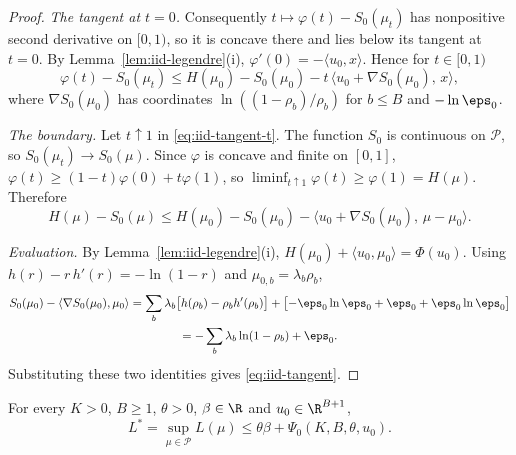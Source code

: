\begin{proof}
\emph{The tangent at $t=0$.} Consequently
$t\mapsto\varphi(t)-S_0(\mu_t)$ has nonpositive second derivative on $[0,1)$, so it is
concave there and lies below its tangent at $t=0$. By Lemma~\ref{lem:iid-legendre}(i),
$\varphi'(0)=-\langle u_0,x\rangle$. Hence for $t\in[0,1)$
\begin{equation}\label{eq:iid-tangent-t}
\varphi(t)-S_0(\mu_t)\le H(\mu_0)-S_0(\mu_0)-t\,\bigl\langle u_0+\nabla S_0(\mu_0),\,x\bigr\rangle,
\end{equation}
where $\nabla S_0(\mu_0)$ has coordinates $\ln((1-\rho_b)/\rho_b)$ for $b\le B$ and
$-\ln\eps_0$.

\emph{The boundary.} Let $t\uparrow1$ in \eqref{eq:iid-tangent-t}. The function $S_0$ is
continuous on $\mathcal{P}$, so $S_0(\mu_t)\to S_0(\mu)$. Since $\varphi$ is concave and
finite on $[0,1]$, $\varphi(t)\ge(1-t)\varphi(0)+t\varphi(1)$, so
$\liminf_{t\uparrow1}\varphi(t)\ge\varphi(1)=H(\mu)$. Therefore
\[
H(\mu)-S_0(\mu)\le H(\mu_0)-S_0(\mu_0)-\bigl\langle u_0+\nabla S_0(\mu_0),\,\mu-\mu_0\bigr\rangle .
\]

\emph{Evaluation.} By Lemma~\ref{lem:iid-legendre}(i),
$H(\mu_0)+\langle u_0,\mu_0\rangle=\Phi(u_0)$. Using $h(r)-r\,h'(r)=-\ln(1-r)$ and
$\mu_{0,b}=\lambda_b\rho_b$,
\begin{multline*}
S_0(\mu_0)-\langle\nabla S_0(\mu_0),\mu_0\rangle
=\sum_b\lambda_b\bigl[h(\rho_b)-\rho_bh'(\rho_b)\bigr]
 +\bigl[-\eps_0\ln\eps_0+\eps_0+\eps_0\ln\eps_0\bigr]\\
=-\sum_b\lambda_b\ln(1-\rho_b)+\eps_0 .
\end{multline*}
Substituting these two identities gives \eqref{eq:iid-tangent}.
\end{proof}

\begin{proposition}\label{prop:iid-tangent-bound}
For every $K>0$, $B\ge1$, $\theta>0$, $\beta\in\R$ and $u_0\in\R^{B+1}$,
\[
L^\ast=\sup_{\mu\in\mathcal{P}}L(\mu)\le\theta\beta+\Psi_0(K,B,\theta,u_0).
\]
\end{proposition}

